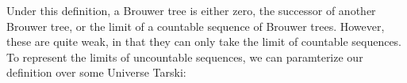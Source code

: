 \begin{code}[hide]%
%
\>[2]\AgdaSpace{}%
\AgdaSpace{}%
\AgdaSpace{}%
\AgdaSpace{}%
\AgdaSymbol{(}\AgdaSpace{}%
\AgdaSymbol{;}\AgdaSpace{}%
\AgdaOperator{\AgdaFunction{\AgdaUnderscore{}<\AgdaUnderscore{}}}\AgdaSpace{}%
\AgdaSymbol{;}\AgdaSpace{}%
\AgdaOperator{\AgdaPrimitive{\AgdaUnderscore{}+\AgdaUnderscore{}}}\AgdaSymbol{)}\<%
\\
%
\>[2]\AgdaSpace{}%
\AgdaSpace{}%
\<%
\\
%
\>[2]\AgdaSpace{}%
\AgdaSpace{}%
\<%
\\
%
\>[2]\AgdaSpace{}%
\AgdaSpace{}%
\<%
\\
%
\>[2]\AgdaSpace{}%
\AgdaSpace{}%
\<%
\\
\>[0]\<%
\end{code}

Under this definition, a Brouwer tree is either zero, the successor of another Brouwer tree, or the limit of a countable sequence of Brouwer trees. However, these are quite weak, in that they can only take the limit of countable sequences.
To represent the limits of uncountable sequences, we can paramterize our definition over some Universe \ala Tarski:

\begin{code}%
\>[0][@{}l@{\AgdaIndent{1}}]%
\>[2]\AgdaSpace{}%
\AgdaSpace{}%
\AgdaSymbol{\{}\AgdaSymbol{\}}\<%
\\
\>[2][@{}l@{\AgdaIndent{0}}]%
\>[4]\AgdaSymbol{(}\AgdaSpace{}%
\AgdaSymbol{:}\AgdaSpace{}%
\AgdaSpace{}%
\AgdaSymbol{)}\<%
\\
%
\>[4]\AgdaSymbol{(}\AgdaSpace{}%
\AgdaSymbol{:}\AgdaSpace{}%
\AgdaSpace{}%
\AgdaSpace{}%
\AgdaSpace{}%
\AgdaSymbol{)}\<%
\\
%
\>[4]\AgdaSymbol{(}\AgdaSpace{}%
\AgdaSymbol{:}\AgdaSpace{}%
\AgdaSymbol{)}\AgdaSpace{}%
\AgdaSymbol{(}\AgdaSpace{}%
\AgdaSymbol{:}\AgdaSpace{}%
\AgdaSpace{}%
\AgdaSymbol{(}\AgdaSpace{}%
\AgdaSymbol{)}\AgdaSpace{}%
\AgdaSpace{}%
\AgdaSymbol{)}\AgdaSpace{}%
\<%
\end{code}


